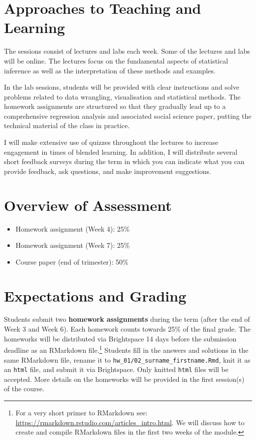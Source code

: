 \documentclass[abstract=on,parskip=full,headings=standardclasses,fontsize=11pt,paper=a4]{scrartcl}
\begin{document}
\section*{Approaches to Teaching and Learning}

The sessions consist of lectures and labs each week. Some of the lectures and labs will be online. The lectures focus on the fundamental aspects of statistical inference as well as the interpretation of these methods and examples. %

In the  lab sessions, students will be provided with clear instructions and solve problems related to data wrangling, visualisation and statistical methods. The homework assignments are structured so that they gradually lead up to a comprehensive regression analysis and associated social science paper, putting the technical material of the class in practice.

I will make extensive use of quizzes  throughout the lectures to increase engagement in times of blended learning. In addition, I will distribute several short feedback surveys during the term in which you can indicate what you can provide feedback, ask questions, and make improvement suggestions. 

\section*{Overview of Assessment}

\begin{itemize}
\item Homework assignment (Week 4): 25\% 
\item Homework assignment  (Week 7): 25\% 
\item Course paper (end of trimester): 50\%
\end{itemize}


\section*{Expectations and Grading}


Students submit two \textbf{homework assignments} during the term (after the end of Week 3 and Week 6). Each homework counts towards 25\% of the final grade.  The homeworks will be distributed via Brightspace 14 days before the submission deadline as an RMarkdown file.\footnote{For a very short primer to RMarkdown see: \url{https://rmarkdown.rstudio.com/articles_intro.html}. We will discuss how to create and compile RMarkdown files in the first two weeks of the module.} Students fill in the answers and solutions in the same RMarkdown file, rename it to \texttt{hw\_01/02\_surname\_firstname.Rmd}, knit it as an \texttt{html} file, and submit it via Brightspace. Only knitted \texttt{html} files will be accepted. More details on the homeworks will be provided in the first session(s) of the course.
\end{document}
